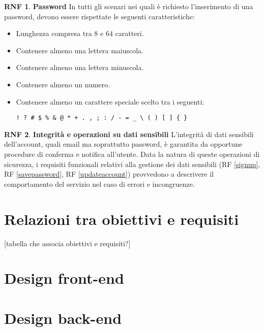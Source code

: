 \documentclass[11pt, a4paper]{article}
\theoremstyle{definition}
\newtheorem{nonfuncreq}{RNF} %
\begin{document}
\begin{nonfuncreq}
\label{legalpassword}
\textbf{Password }
In tutti gli scenari nei quali è richiesto l'inserimento di una password,
devono essere rispettate le seguenti caratteristiche:
\begin{itemize}
    \item Lunghezza compresa tra 8 e 64 caratteri.
    \item Contenere almeno una lettera maiuscola.
    \item Contenere almeno una lettera minuscola.
    \item Contenere almeno un numero.
    \item Contenere almeno un carattere speciale scelto tra i
    seguenti:
    \begin{center}
        \verb|! ? # $ % & @ * + . , ; : / - = _ \ ( ) [ ] { }|
    \end{center}
\end{itemize}
\end{nonfuncreq}

\begin{nonfuncreq}
\textbf{Integrità e operazioni su dati sensibili }
L'integrità di dati sensibili dell'account, quali email ma soprattutto password,
è garantita da opportune procedure di conferma e notifica all'utente.
Data la natura di queste operazioni di sicurezza, i requisiti funzionali
relativi alla gestione dei dati sensibili (RF \ref{signup}, RF \ref{savepassword},
RF \ref{updateaccount})
provvedono a descrivere il comportamento del servizio nel caso di errori
e incongruenze.
\end{nonfuncreq}


\newpage
\section{Relazioni tra obiettivi e requisiti}
[tabella che associa obiettivi e requisiti?]
\section{Design front-end}
\section{Design back-end}
\end{document}
